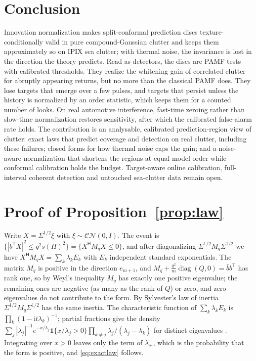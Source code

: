 \documentclass[journal]{IEEEtran}
\begin{document}
\section{Conclusion}
Innovation normalization makes split-conformal prediction discs texture-conditionally valid in pure compound-Gaussian clutter and keeps them approximately so on IPIX sea clutter; with thermal noise, the invariance is lost in the direction the theory predicts. Read as detectors, the discs are PAMF tests with calibrated thresholds. They realize the whitening gain of correlated clutter for abruptly appearing returns, but no more than the classical PAMF does. They lose targets that emerge over a few pulses, and targets that persist unless the history is normalized by an order statistic, which keeps them for a counted number of looks. On real automotive interference, fast-time zeroing rather than slow-time normalization restores sensitivity, after which the calibrated false-alarm rate holds. The contribution is an analysable, calibrated prediction-region view of clutter: exact laws that predict coverage and detection on real clutter, including these failures; closed forms for how thermal noise caps the gain; and a noise-aware normalization that shortens the regions at equal model order while conformal calibration holds the budget. Target-aware online calibration, full-interval coherent detection and untouched sea-clutter data remain open.

\appendices
\section{Proof of Proposition~\ref{prop:law}}\label{app:law}
Write $X=\Sigma^{1/2}\xi$ with $\xi\sim\mathcal{CN}(0,I)$. The event is $\{|b^{\mathsf T}X|^2\le q^2s(H)^2\}=\{X^{\mathsf H}M_qX\le0\}$, and after diagonalizing $\Sigma^{1/2}M_q\Sigma^{1/2}$ we have $X^{\mathsf H}M_qX=\sum_k\lambda_kE_k$ with $E_k$ independent standard exponentials. The matrix $M_q$ is positive in the direction $e_{m+1}$, and $M_q+\frac{q^2}{m}\operatorname{diag}(Q,0)=\bar bb^{\mathsf T}$ has rank one, so by Weyl's inequality $M_q$ has exactly one positive eigenvalue; the remaining ones are negative (as many as the rank of $Q$) or zero, and zero eigenvalues do not contribute to the form. By Sylvester's law of inertia $\Sigma^{1/2}M_q\Sigma^{1/2}$ has the same inertia. The characteristic function of $\sum_k\lambda_kE_k$ is $\prod_k(1-\mathrm i t\lambda_k)^{-1}$; partial fractions give the density $\sum_j|\lambda_j|^{-1}e^{-x/\lambda_j}\mathbf 1\{x/\lambda_j>0\}\prod_{k\ne j}\lambda_j/(\lambda_j-\lambda_k)$ for distinct eigenvalues \cite{alnaffouri2016}. Integrating over $x>0$ leaves only the term of $\lambda_+$, which is the probability that the form is positive, and \eqref{eq:exactlaw} follows.
\end{document}
